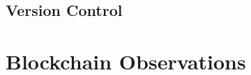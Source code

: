 \documentclass[USenglish]{uit-thesis}
\begin{document}
\section{Version Control}
\label{sec:versioncontrol}

\chapter{Blockchain Observations}
\label{chap:evaluation}



\end{document}
